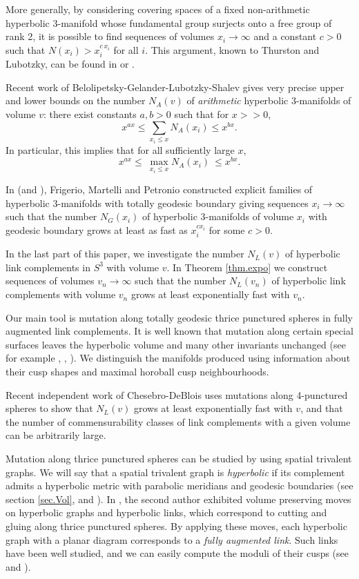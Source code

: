 \documentclass[reqno]{amsproc}  %
\begin{document}
More generally, by considering covering spaces of a fixed non-arithmetic 
hyperbolic 3-manifold whose fundamental group surjects onto a free group of rank 2,
it is possible to find sequences of volumes $x_i \to \infty$ and a constant $c >0$
such that $N(x_i) > x_i^{c \,x_i}$ for all $i$. This argument, known to Thurston 
and Lubotzky, can be found in \cite[pp2633-2634]{carlip} or \cite[p1162]{BGLM}. 

Recent work of  Belolipetsky-Gelander-Lubotzky-Shalev \cite{BGLS} 
gives very  precise upper and lower bounds on the number $N_A(v)$ of
{\em arithmetic} hyperbolic 3-manifolds of volume $v$: there exist constants
$a,b>0$ such that for $x >>0$, 
$$ x^{ax} \le \sum_{x_i \le x} N_{A}(x_i) \le  x^{bx}.$$
In particular, this implies that for all sufficiently large $x$,
$$ x^{ax} \le ~\max_{x_i \le x} N_{A}(x_i)~ \le  x^{bx}.$$
 
In \cite{FMP2} (and \cite{FMP1}), Frigerio, Martelli and Petronio constructed explicit families
of hyperbolic $3$-manifolds with totally geodesic boundary 
giving sequences $x_i \to \infty$ such that the number $N_{G} (x_i)$ of hyperbolic 3-manifolds of volume $x_i$ with geodesic boundary grows at least as fast as $x_i^{c x_i}$ for some $c>0$.

\medskip
In the last part of this paper, we investigate
the number $N_L(v)$ of hyperbolic link complements in $S^3$ with volume $v$.
In Theorem \ref{thm.expo} 
we construct sequences of volumes  $v_n \to \infty$ 
such that the number $N_L(v_n)$ of hyperbolic link complements with volume $v_n$ grows at least exponentially fast with $v_n$. 

Our main tool is mutation along totally geodesic thrice punctured spheres in fully augmented link complements.
It is well known that mutation along certain special surfaces leaves the hyperbolic volume
 and many other invariants unchanged (see for example \cite{Ada}, \cite{Rub},  \cite{DGST}).
 We distinguish the manifolds produced using information 
 about their cusp shapes and maximal horoball cusp neighbourhoods. 

Recent independent work of Chesebro-DeBlois \cite{CD} uses 
mutations along 4-punctured spheres to show that  $N_L(v)$ grows 
at least exponentially fast with $v$, and that the number of commensurability classes
of link complements with a given volume can be arbitrarily large.



Mutation along thrice punctured spheres can be studied by using spatial trivalent graphs. 
We will say that a spatial trivalent graph is {\em hyperbolic} if its complement admits a hyperbolic metric with parabolic meridians and geodesic boundaries (see section \ref{sec.Vol}, \cite{HHMP} and \cite{Mas}).
In \cite{Mas}, the second author exhibited volume preserving moves on hyperbolic graphs and hyperbolic links, which correspond to cutting and gluing along thrice punctured spheres.
By applying these moves, each hyperbolic graph with a planar diagram corresponds to a {\em fully augmented link}.
Such links have been well studied, and we can easily compute the moduli of their cusps (see \cite{FP} and \cite{Pur}).
\end{document}
